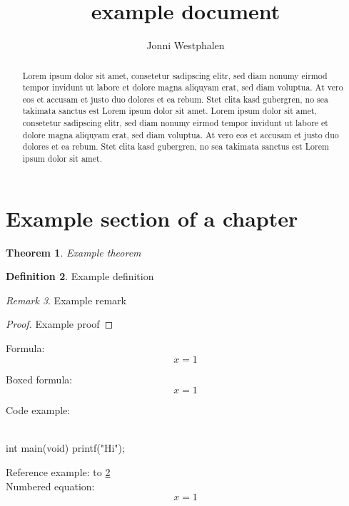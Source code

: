 \documentclass[12pt]{amsart}
\title{example document}
\author[J. Westphalen]{Jonni Westphalen}
\theoremstyle{plain}
\newtheorem{theorem}{Theorem}[section]
\theoremstyle{definition}
\newtheorem{definition}[theorem]{Definition}
\theoremstyle{remark}
\newtheorem{remark}[theorem]{Remark}
\numberwithin{equation}{theorem}
\begin{document}
\maketitle

\begin{abstract}
    Lorem ipsum dolor sit amet, consetetur sadipscing elitr, sed diam nonumy eirmod tempor invidunt ut labore et dolore magna aliquyam erat, sed diam voluptua. At vero eos et accusam et justo duo dolores et ea rebum. Stet clita kasd gubergren, no sea takimata sanctus est Lorem ipsum dolor sit amet. Lorem ipsum dolor sit amet, consetetur sadipscing elitr, sed diam nonumy eirmod tempor invidunt ut labore et dolore magna aliquyam erat, sed diam voluptua. At vero eos et accusam et justo duo dolores et ea rebum. Stet clita kasd gubergren, no sea takimata sanctus est Lorem ipsum dolor sit amet.
\end{abstract}

\tableofcontents \newpage

\section{Example section of a chapter}

\begin{theorem}
Example theorem
\end{theorem}

\begin{definition}\label{112}
Example definition
\end{definition}

\begin{remark}
Example remark
\end{remark}

\begin{proof}
Example proof
\end{proof}

Formula:
$$x = 1$$

Boxed formula:
$$\boxed{x = 1}$$


Code example:\\
\\
\begin{myC}
int main(void) {
    printf("Hi");
}
\end{myC}

Reference example: to \ref{112}\\

Numbered equation:\\
\begin{equation}
    x = 1
\end{equation}
\end{document}
